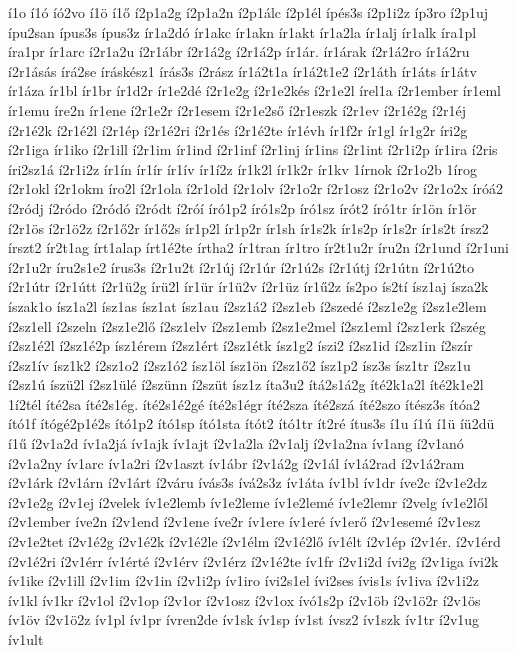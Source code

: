 {í1o
í1ó
íó2vo
í1ö
í1ő
í2p1a2g
í2p1a2n
í2p1álc
í2p1él
ípés3s
í2p1i2z
íp3ro
í2p1uj
ípu2san
ípus3s
ípus3z
ír1a2dó
ír1akc
ír1akn
ír1akt
ír1a2la
ír1alj
ír1alk
íra1pl
íra1pr
ír1arc
í2r1a2u
í2r1ábr
í2r1á2g
í2r1á2p
ír1ár.
ír1árak
í2r1á2ro
ír1á2ru
í2r1ásás
írá2se
íráskész1
írás3s
í2rász
ír1á2t1a
ír1á2t1e2
í2r1áth
ír1áts
ír1átv
ír1áza
ír1bl
ír1br
ír1d2r
ír1e2dé
í2r1e2g
í2r1e2kés
í2r1e2l
írel1a
í2r1ember
ír1eml
ír1emu
íre2n
ír1ene
í2r1e2r
í2r1esem
í2r1e2ső
í2r1eszk
í2r1ev
í2r1é2g
í2r1éj
í2r1é2k
í2r1é2l
í2r1ép
í2r1é2ri
í2r1és
í2r1é2te
ír1évh
ír1f2r
ír1gl
ír1g2r
íri2g
í2r1iga
ír1iko
í2r1ill
í2r1im
ír1ind
í2r1inf
í2r1inj
ír1ins
í2r1int
í2r1i2p
ír1ira
í2ris
íri2sz1á
í2r1i2z
ír1ín
ír1ír
ír1ív
ír1í2z
ír1k2l
ír1k2r
ír1kv
1írnok
í2r1o2b
1írog
í2r1okl
í2r1okm
íro2l
í2r1ola
í2r1old
í2r1olv
í2r1o2r
í2r1osz
í2r1o2v
í2r1o2x
íróá2
í2ródj
í2ródo
í2ródó
í2ródt
í2róí
író1p2
író1s2p
író1sz
írót2
író1tr
ír1ön
ír1ör
í2r1ös
í2r1ö2z
í2r1ő2r
ír1ő2s
ír1p2l
ír1p2r
ír1sh
ír1s2k
ír1s2p
ír1s2r
ír1s2t
írsz2
írszt2
ír2t1ag
írt1alap
írt1é2te
írtha2
ír1tran
ír1tro
ír2t1u2r
íru2n
í2r1und
í2r1uni
í2r1u2r
íru2s1e2
írus3s
í2r1u2t
í2r1új
í2r1úr
í2r1ú2s
í2r1útj
í2r1útn
í2r1ú2to
í2r1útr
í2r1útt
í2r1ü2g
írü2l
ír1ür
ír1ü2v
í2r1üz
ír1ű2z
ís2po
ís2tí
ísz1aj
ísza2k
íszak1o
ísz1a2l
ísz1as
ísz1at
ísz1au
í2sz1á2
í2sz1eb
í2szedé
í2sz1e2g
í2sz1e2lem
í2sz1ell
í2szeln
í2sz1e2lő
í2sz1elv
í2sz1emb
í2sz1e2mel
í2sz1eml
í2sz1erk
í2szég
í2sz1é2l
í2sz1é2p
ísz1érem
í2sz1ért
í2sz1étk
ísz1g2
íszi2
í2sz1id
í2sz1in
í2szír
í2sz1ív
ísz1k2
í2sz1o2
í2sz1ó2
ísz1öl
ísz1ön
í2sz1ő2
ísz1p2
ísz3s
ísz1tr
í2sz1u
í2sz1ú
íszü2l
í2sz1ülé
í2szünn
í2szüt
ísz1z
íta3u2
ítá2s1á2g
íté2k1a2l
íté2k1e2l
1í2tél
íté2sa
íté2s1ég.
íté2s1é2gé
íté2s1égr
íté2sza
íté2szá
íté2szo
ítész3s
ítóa2
ító1f
ítógé2p1é2s
ító1p2
ító1sp
ító1sta
ítót2
ító1tr
ít2ré
ítus3s
í1u
í1ú
í1ü
íü2dü
í1ű
í2v1a2d
ív1a2já
ív1ajk
ív1ajt
í2v1a2la
í2v1alj
í2v1a2na
ív1ang
í2v1anó
í2v1a2ny
ív1arc
ív1a2ri
í2v1aszt
ív1ábr
í2v1á2g
í2v1ál
ív1á2rad
í2v1á2ram
í2v1árk
í2v1árn
í2v1árt
í2váru
ívás3s
ívá2s3z
ív1áta
ív1bl
ív1dr
íve2c
í2v1e2dz
í2v1e2g
í2v1ej
í2velek
ív1e2lemb
ív1e2leme
ív1e2lemé
ív1e2lemr
í2velg
ív1e2lől
í2v1ember
íve2n
í2v1end
í2v1ene
íve2r
ív1ere
ív1eré
ív1erő
í2v1esemé
í2v1esz
í2v1e2tet
í2v1é2g
í2v1é2k
í2v1é2le
í2v1élm
í2v1é2lő
ív1élt
í2v1ép
í2v1ér.
í2v1érd
í2v1é2ri
í2v1érr
ív1érté
í2v1érv
í2v1érz
í2v1é2te
ív1fr
í2v1i2d
ívi2g
í2v1iga
ívi2k
ív1ike
í2v1ill
í2v1im
í2v1in
í2v1i2p
ív1iro
ívi2s1el
ívi2ses
ívis1s
ív1iva
í2v1i2z
ív1kl
ív1kr
í2v1ol
í2v1op
í2v1or
í2v1osz
í2v1ox
ívó1s2p
í2v1öb
í2v1ö2r
í2v1ös
ív1öv
í2v1ö2z
ív1pl
ív1pr
ívren2de
ív1sk
ív1sp
ív1st
ívsz2
ív1szk
ív1tr
í2v1ug
ív1ult
}
